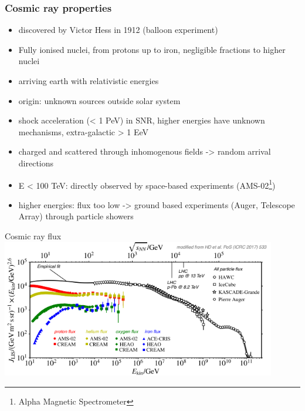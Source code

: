 \documentclass[aspectratio=1610, 9pt]{beamer}
\begin{document}
\begin{frame}\frametitle{Cosmic ray properties}
  \begin{itemize}
    \item discovered by Victor Hess in 1912 (balloon experiment)
    \item Fully ionised nuclei, from protons up to iron, negligible fractions
    to higher nuclei
    \item arriving earth with relativistic energies
    \item origin: unknown sources outside solar system
    \item shock acceleration (< 1 PeV) in SNR, higher energies have unknown
    mechanisms, extra-galactic > 1 EeV
    \item charged and scattered through inhomogenous fields -> random arrival directions
    \item E < 100 TeV: directly observed by space-based experiments (AMS-02\footnote{Alpha Magnetic Spectrometer})
    \item higher energies: flux too low -> ground based experiments
    (Auger, Telescope Array) through particle showers
  \end{itemize}
\end{frame}

\begin{frame}{Cosmic ray flux}
  \includegraphics[width=0.9\textwidth]{plots/knee_heel.png}
\end{frame}

\end{document}
